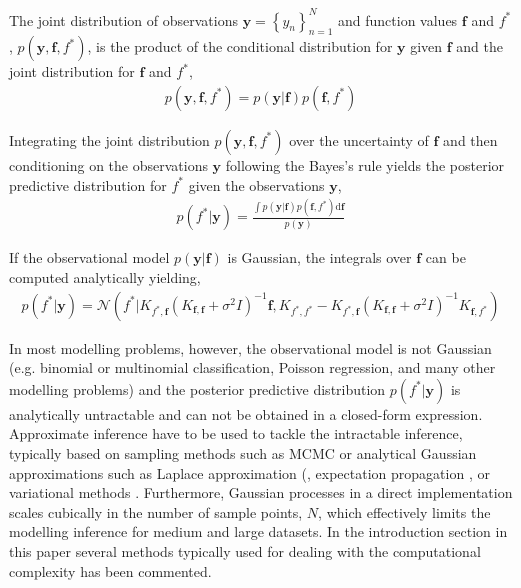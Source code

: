 \documentclass[]{interact}
\theoremstyle{plain}%
\theoremstyle{definition}
\theoremstyle{remark}
\begin{document}
The joint distribution of observations $\mathbf{y} = \left\lbrace y_n \right\rbrace_{n=1}^N$ and function values $\mathbf{f}$ and $f^*$, $p(\mathbf{y}, \mathbf{f}, f^*)$, is the product of the conditional distribution for $\mathbf{y}$ given $\mathbf{f}$ and the joint distribution for $\mathbf{f}$ and $f^*$,
\begin{align*}
	p(\mathbf{y}, \mathbf{f}, f^*) = p(\mathbf{y}|\mathbf{f})p(\mathbf{f}, f^*)
\end{align*}

Integrating the joint distribution  $p(\mathbf{y}, \mathbf{f}, f^*)$ over the uncertainty of $\mathbf{f}$ and then conditioning on the observations $\mathbf{y}$ following the Bayes's rule yields the posterior predictive distribution for $f^*$ given the observations $\mathbf{y}$,
%
\begin{align*}
	p(f^*|\mathbf{y}) = \frac{\int p(\mathbf{y}|\mathbf{f})p(\mathbf{f}, f^*)\text{d}\mathbf{f}}{p(\mathbf{y})}
\end{align*}

If the observational model $p(\mathbf{y}|\mathbf{f})$ is Gaussian, the integrals over $\mathbf{f}$ can be computed analytically yielding,
\begin{align*}
	p(f^*| \mathbf{y}) = \mathcal{N}(f^*| K_{f^*,\mathbf{f}} (K_{\mathbf{f},\mathbf{f}} + \sigma^2I)^{-1} \mathbf{f},  K_{f^*,f^*}-K_{f^*,\mathbf{f}} (K_{\mathbf{f},\mathbf{f}} + \sigma^2I)^{-1} K_{\mathbf{f},f^*}  )
\end{align*}

In most modelling problems, however, the observational model is not Gaussian (e.g. binomial or multinomial classification, Poisson  regression, and many other modelling problems) and the posterior predictive distribution $p(f^*| \mathbf{y})$ is analytically untractable and can not be obtained in a closed-form expression. Approximate inference have to be used to tackle the intractable inference, typically based on sampling methods such as MCMC \citep{brooks_2011} or analytical Gaussian approximations such as Laplace approximation (\citep{williams1998bayesian,rasmussen2006gaussian}, expectation propagation \citep{minka2001expectation}, or variational methods \citep{gibbs2000variational,csato2000efficient}. Furthermore, Gaussian processes in a direct implementation scales cubically in the number of sample points, $N$, which effectively limits the modelling inference for medium and large datasets. In the introduction section in this paper several methods typically used for dealing with the computational complexity has been commented. \\
\end{document}
